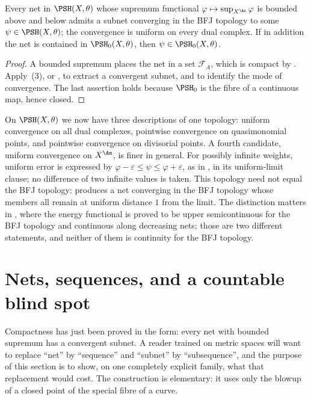 \begin{corollary}
\label{cor:ch22-net-compactness}
Every net in $\PSH(X,\theta)$ whose supremum functional
$\varphi\mapsto\sup_{X^{\An}}\varphi$ is bounded above and below admits a subnet
converging in the BFJ topology to some $\psi\in\PSH(X,\theta)$; the
convergence is uniform on every dual complex.  If in addition the net is
contained in $\PSH_0(X,\theta)$, then $\psi\in\PSH_0(X,\theta)$.
\end{corollary}

\begin{proof}
A bounded supremum places the net in a set $\mathcal F_A$, which is
compact by .  Apply
\,(3), or , to
extract a convergent subnet, and  to
identify the mode of convergence.  The last assertion holds because
$\PSH_0$ is the fibre of a continuous map, hence closed.
\end{proof}

\begin{remark}
\label{rem:ch22-topology-comparison}
On $\PSH(X,\theta)$ we now have three descriptions of one topology:
uniform convergence on all dual complexes, pointwise convergence on
quasimonomial points, and pointwise convergence on divisorial points.  A
fourth candidate, uniform convergence on $X^{\An}$, is finer in general.
For possibly infinite weights, uniform error is expressed by
$\varphi-\varepsilon\leq\psi\leq\varphi+\varepsilon$, as in
, in its uniform-limit clause; no difference of two infinite values is
taken.  This topology need not equal the BFJ topology:  produces
a net converging in the BFJ topology whose members all remain at uniform
distance $1$ from the limit.  The distinction matters in
, where the energy functional is proved to be upper
semicontinuous for the BFJ topology and continuous along decreasing nets;
those are two different statements, and neither of them is continuity for
the BFJ topology.
\end{remark}

\section{Nets, sequences, and a countable blind spot}
\label{sec:ch22-nets}

Compactness has just been proved in the form: every net with bounded
supremum has a convergent subnet.  A reader trained on metric spaces will
want to replace ``net'' by ``sequence'' and ``subnet'' by ``subsequence'',
and the purpose of this section is to show, on one completely explicit
family, what that replacement would cost.  The construction is elementary:
it uses only the blowup of a closed point of the special fibre of a curve.

